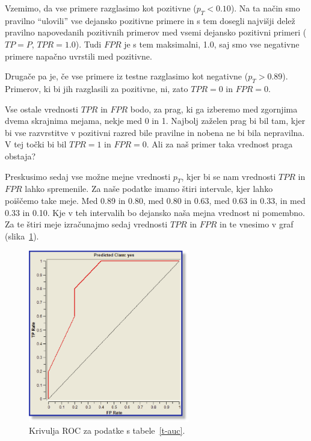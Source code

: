 Vzemimo, da vse primere razglasimo kot pozitivne ($p_T<0.10$). Na ta način smo pravilno ``ulovili'' vse dejansko pozitivne primere in s tem dosegli najvišji delež pravilno napovedanih pozitivnih primerov med vsemi dejansko pozitivni primeri ($TP=P$, $TPR=1.0$). Tudi $FPR$ je s tem maksimalni, 1.0, saj smo vse negativne primere napačno uvrstili med pozitivne.

Drugače pa je, če vse primere iz testne razglasimo kot negativne ($p_T>0.89$). Primerov, ki bi jih razglasili za pozitivne, ni, zato $TPR=0$ in $FPR=0$.

Vse ostale vrednosti $TPR$ in $FPR$ bodo, za prag, ki ga izberemo med zgornjima dvema skrajnima mejama, nekje med 0 in 1. Najbolj zaželen prag bi bil tam, kjer bi vse razvrstitve v pozitivni razred bile pravilne in nobena ne bi bila nepravilna. V tej točki bi bil $TPR=1$ in $FPR=0$. Ali za naš primer taka vrednost praga obstaja?

Preskusimo sedaj vse možne mejne vrednosti $p_T$, kjer bi se nam vrednosti $TPR$ in $FPR$ lahko spremenile. Za naše podatke imamo štiri intervale, kjer lahko poiščemo take meje. Med 0.89 in 0.80, med 0.80 in 0.63, med 0.63 in 0.33, in med 0.33 in 0.10. Kje v teh intervalih bo dejansko naša mejna vrednost ni pomembno. Za te štiri meje izračunajmo sedaj vrednosti $TPR$ in $FPR$ in te vnesimo v graf (slika~\ref{f-roc}).

\begin{figure}[htbp]
\begin{center}
\includegraphics[width=7cm]{slike/roc.png}
\caption{Krivulja ROC za podatke s tabele~\ref{t-auc}.}
\label{f-roc}
\end{center}
\end{figure}


